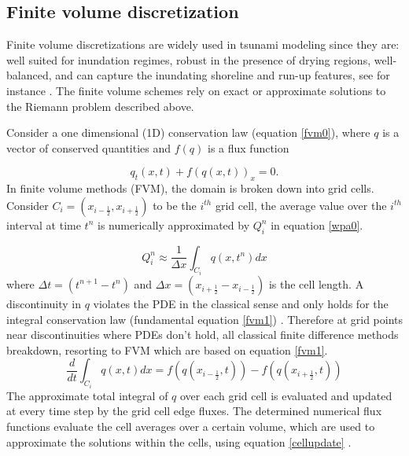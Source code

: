 \documentclass[10pt,a4paper]{article}
\newcommand{\ignore}[1]{}
\begin{document}
	\subsection{Finite volume discretization}
Finite volume discretizations are widely used in tsunami modeling since they are: well suited for inundation regimes, robust in the presence of drying regions, well-balanced, and can capture the inundating shoreline and run-up features, see for instance \citet{ge:2008,ge:2011,george2006finite,be-ge-le-ma:2011,bi2014finite,leveque2002finite,ba-le-mi-ro:2003}. The finite volume schemes rely on exact or approximate solutions to the Riemann problem described above.  

Consider a one dimensional (1D) conservation law  (equation \eqref{fvm0}),  where $q$ is a vector of conserved quantities and $f(q)$ is a flux function

	\begin{equation}
		q_{t}(x,t) + f(q(x,t))_{x} = 0.
		\label{fvm0}
	\end{equation}	
	In finite volume methods (FVM), the domain is broken down into grid cells. Consider $C_{i} = (x_{i-\frac{1}{2}},x_{i+\frac{1}{2}})$ to be the $i^{th}$ grid cell, the average value over the $i^{th}$ interval at time $t^{n}$ is numerically approximated by $Q_{i}^{n}$ in equation \eqref{wpa0}.
	
	\begin{equation}
		Q_{i}^{n} \approx \dfrac{1}{\Delta x} \int_{C_{i}}q(x,t^{n})dx
		\label{wpa0}
	\end{equation}
	where $\Delta t = (t^{n+1} - t^{n})$ and  $\Delta x = (x_{i+\frac{1}{2}} - x_{i-\frac{1}{2}})$ is the cell length. A discontinuity in $q$ violates the PDE in the classical sense and only holds for the integral conservation law (fundamental equation \eqref{fvm1}) \ignore{\cite{leveque2002finite}}. Therefore at grid points near discontinuities where PDEs don't hold, all classical finite difference methods breakdown, resorting to FVM which are based on equation \eqref{fvm1}. 	
	\begin{equation}
		\frac{d}{dt} \int_{C_{i}} q(x,t)dx = f(q(x_{i-\frac{1}{2}},t)) -  f(q(x_{i+\frac{1}{2}},t))
		\label{fvm1}
	\end{equation}	
	The approximate  total integral of $q$ over each grid cell is evaluated and updated at every time step by the grid cell edge fluxes. The determined numerical flux functions evaluate the  cell averages over a certain volume, which are used to approximate the solutions within the cells, using equation \eqref{cellupdate} \ignore{\cite{le-ge-be:2011}}.
	
\end{document}
